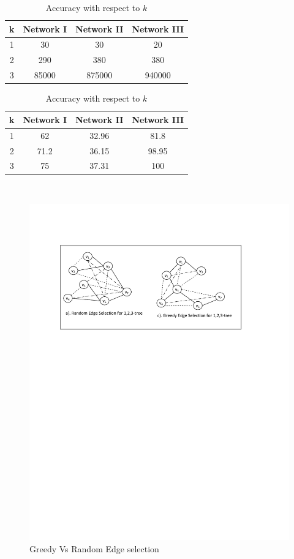 \documentclass[12pt]{article}
\begin{document}
\begin{table}[!htb]
    \begin{minipage}{.5\linewidth}
    \caption{Running time (RT) with respect to $k$}
      \centering
     \begin{tabular}{|c|c|c|c|}
     \hline
         k& Network I & Network II & Network III \\
     \hline
     1&30& 30& 20 \\\hline
     2&290 &380&380	\\\hline
3 &85000&875000&940000	 \\\hline
 



\end{tabular}
    \end{minipage}
    \begin{minipage}{.5\linewidth}
      \caption{Accuracy with respect to $k$}
      \centering
     \begin{tabular}{|c|c|c|c|}
     \hline
     k& Network I & Network II & Network III \\
     \hline
      1 & 62&32.96& 81.8 \\\hline
2 &71.2 & 36.15& 98.95\\\hline
3 &75& 37.31& 100\\\hline
\end{tabular}
    \end{minipage}\\
    
\end{table}
\begin{figure}
\begin{minipage}{.9\linewidth}
\includegraphics[width=6 in, height=2.8 in]{Edge_selection1.pdf}
\caption{Greedy Vs Random Edge selection}
\label{Fig:ES}
\end{minipage}
\end{figure}
\end{document}
